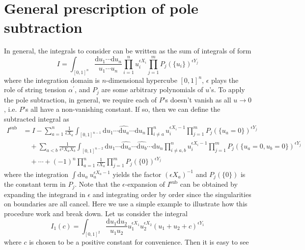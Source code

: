 \documentclass[12pt]{article}
\theoremstyle{definition}
\theoremstyle{plain}
\newcommand{\dif}{\mathrm{d}} %
\begin{document}
\section{General prescription of pole subtraction}

In general, the integrals to consider can be written as the sum of integrals of form
\begin{equation}
    I=\int_{[0,1]^{n}}\frac{\dif u_{1}\cdots \dif u_{n}}{u_{1}\cdots u_{n}} \prod_{i=1}^{n}u_{i}^{\epsilon X_{i}} 
    \prod_{j=1}^{m}P_{j}(\{u_{i}\})^{\epsilon Y_{j}} \label{prepolesub}
\end{equation}
where the integration domain is $n$-dimensional hypercube $[0,1]^{n}$, $\epsilon$ plays the role of string tension $\alpha^{\prime}$, and ${P_{j}}$ are some arbitrary polynomials of $u$'s. To apply the pole subtraction, in general, we require each of $P$'s doesn't vanish as all $u \to 0$, i.e. $P$'s all have a non-vanishing constant. If so, then we can define the subtracted integral as 
\begin{align}
  I^{\text{sub}}&= I - \sum_{a=1}^{n}\frac{1}{\epsilon X_{a}}\int_{[0,1]^{n-1}}\dif u_{1}\cdots \widehat{\dif u_{a}}\cdots \dif u_{n} \prod_{i\neq a}^{n}u_{i}^{\epsilon X_{i}-1} 
  \prod_{j=1}^{m}P_{j}(\{u_{a}{=}0\})^{\epsilon Y_{j}} \nonumber \\
  &\quad +\sum_{a<b}\frac{1}{\epsilon^{2} X_{a}X_{b}}\int_{[0,1]^{n-2}}\dif u_{1}\cdots 
  \widehat{\dif u_{a}}\cdots \widehat{\dif u_{b}}\cdots \dif u_{n} \prod_{i\neq a,b}^{n}u_{i}^{\epsilon X_{i}-1}
  \prod_{j=1}^{m}P_{j}(\{u_{a}{=}0,u_{b}{=}0\})^{\epsilon Y_{j}}  \nonumber \\
  &\quad +\cdots+ (-1)^{n}\prod_{a=1}^{n}\frac{1}{\epsilon X_{a}} \prod_{j=1}^{m} P_{j}(\{0\})^{\epsilon Y_{j}}
\end{align}
where the integration $\int \dif u_{a} \:u_{a}^{\epsilon X_{a}-1}$ yields the factor $(\epsilon X_{a})^{-1}$ and $P_{j}(\{0\})$ is the constant term in $P_{j}$. Note that the $\epsilon$-expansion of $I^{\text{sub}}$ can be obtained by expanding the integrand in $\epsilon$ and integrating order by order since the singularities on boundaries are all cancel. Here we use a simple example to illustrate how this procedure work and break down. Let us consider the integral 
\begin{equation}
    I_{1}(c) = \int_{[0,1]^{2}} \frac{\dif u_{1}\dif u_{2}}{u_{1}u_{2}} u_{1}^{\epsilon X_{1}}u_{2}^{\epsilon X_{2}} (u_{1}+u_{2}+c)^{\epsilon Y_{1}}
\end{equation}
where $c$ is chosen to be a positive constant for convenience. Then it is easy to see 
\end{document}
